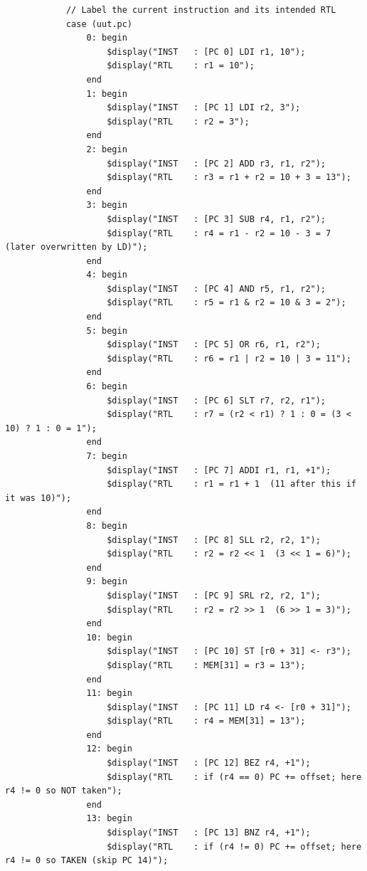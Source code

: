 \documentclass[12pt]{report}
\begin{document}
\begin{lstlisting}
            // Label the current instruction and its intended RTL
            case (uut.pc)
                0: begin
                    $display("INST   : [PC 0] LDI r1, 10");
                    $display("RTL    : r1 = 10");
                end
                1: begin
                    $display("INST   : [PC 1] LDI r2, 3");
                    $display("RTL    : r2 = 3");
                end
                2: begin
                    $display("INST   : [PC 2] ADD r3, r1, r2");
                    $display("RTL    : r3 = r1 + r2 = 10 + 3 = 13");
                end
                3: begin
                    $display("INST   : [PC 3] SUB r4, r1, r2");
                    $display("RTL    : r4 = r1 - r2 = 10 - 3 = 7 (later overwritten by LD)");
                end
                4: begin
                    $display("INST   : [PC 4] AND r5, r1, r2");
                    $display("RTL    : r5 = r1 & r2 = 10 & 3 = 2");
                end
                5: begin
                    $display("INST   : [PC 5] OR r6, r1, r2");
                    $display("RTL    : r6 = r1 | r2 = 10 | 3 = 11");
                end
                6: begin
                    $display("INST   : [PC 6] SLT r7, r2, r1");
                    $display("RTL    : r7 = (r2 < r1) ? 1 : 0 = (3 < 10) ? 1 : 0 = 1");
                end
                7: begin
                    $display("INST   : [PC 7] ADDI r1, r1, +1");
                    $display("RTL    : r1 = r1 + 1  (11 after this if it was 10)");
                end
                8: begin
                    $display("INST   : [PC 8] SLL r2, r2, 1");
                    $display("RTL    : r2 = r2 << 1  (3 << 1 = 6)");
                end
                9: begin
                    $display("INST   : [PC 9] SRL r2, r2, 1");
                    $display("RTL    : r2 = r2 >> 1  (6 >> 1 = 3)");
                end
                10: begin
                    $display("INST   : [PC 10] ST [r0 + 31] <- r3");
                    $display("RTL    : MEM[31] = r3 = 13");
                end
                11: begin
                    $display("INST   : [PC 11] LD r4 <- [r0 + 31]");
                    $display("RTL    : r4 = MEM[31] = 13");
                end
                12: begin
                    $display("INST   : [PC 12] BEZ r4, +1");
                    $display("RTL    : if (r4 == 0) PC += offset; here r4 != 0 so NOT taken");
                end
                13: begin
                    $display("INST   : [PC 13] BNZ r4, +1");
                    $display("RTL    : if (r4 != 0) PC += offset; here r4 != 0 so TAKEN (skip PC 14)");

\end{lstlisting}
\end{document}
